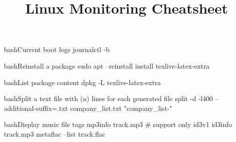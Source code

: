 \documentclass[10pt,a4paper]{article}
\title{\color{w3schools}Linux Monitoring Cheatsheet
}
\begin{document}
\maketitle
\small
\begin{multicols}{3}

\thispagestyle{empty}
\scriptsize

% 




\begin{codebox}{bash}{Current boot logs}
journalctl -b

\end{codebox}

\begin{codebox}{bash}{Reinstall a package}
sudo apt --reinstall install texlive-latex-extra

\end{codebox}

\begin{codebox}{bash}{List package content}
dpkg -L texlive-latex-extra

\end{codebox}

\begin{codebox}{bash}{Split a text file with (n) lines for each generated file}
split  -d -l400 --additional-suffix=.txt company_list.txt "company_list-"

\end{codebox}

\begin{codebox}{bash}{Display music file tags}
mp3info track.mp3    # support only id3v1
id3info track.mp3    
metaflac --list track.flac

\end{codebox}


\AtNextBibliography{\footnotesize}
\printbibliography  
\end{multicols}
\end{document}
